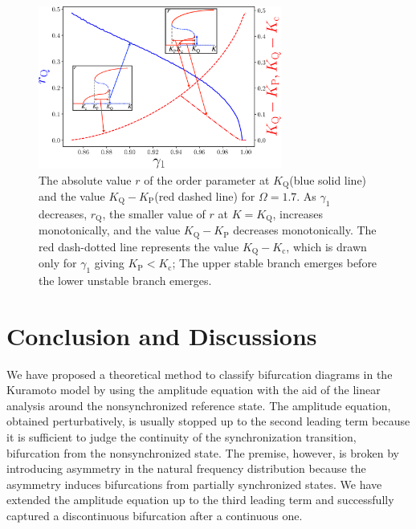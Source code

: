 \begin{figure}
\begin{center}
\includegraphics[width=8cm]{figs/jump.eps}
\end{center}
\caption{The absolute value $r$ of the order parameter
  at $K_{\mathrm{Q}}$(blue solid line)
  and the value $K_{\mathrm{Q}}-K_{\mathrm{P}}$(red dashed line)
  for $\Omega=1.7$.
  As $\gamma_{1}$ decreases,
  $r_{\mathrm{Q}}$, the smaller value of $r$ at $K=K_{\mathrm{Q}}$,
  increases monotonically,
  and the value $K_{\mathrm{Q}}-K_{\mathrm{P}}$
  decreases monotonically.
  The red dash-dotted line represents the value
  $K_{\mathrm{Q}}-K_{\mathrm{c}}$,
  which is drawn only for $\gamma_{1}$ giving $K_{\mathrm{P}}<K_{\mathrm{c}}$;
  The upper stable branch emerges
  before the lower unstable branch emerges.
  }
  \label{fig:jump}
\end{figure}




\section{Conclusion and Discussions}
\label{sec:conclusion}

We have proposed a theoretical method to classify bifurcation diagrams
in the Kuramoto model
by using the amplitude equation with the aid of the linear analysis
around the nonsynchronized reference state.
The amplitude equation, obtained perturbatively,
is usually stopped up to the second leading term
because it is sufficient to judge the continuity
of the synchronization transition, bifurcation from the nonsynchronized state.
The premise, however, is broken by introducing asymmetry
  in the natural frequency distribution
  because the asymmetry induces bifurcations from partially synchronized states.
We have extended the amplitude equation up to the third leading term
and successfully captured a discontinuous bifurcation after a continuous one.

